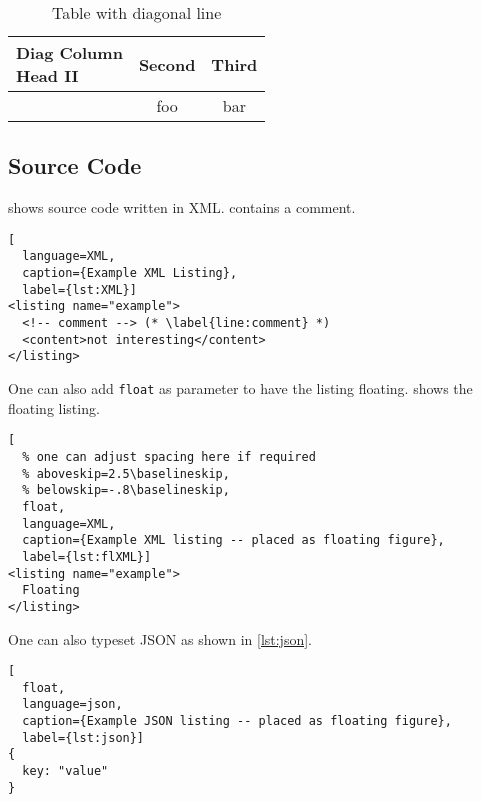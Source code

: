 \documentclass[sigconf,balance]{acmart}
\begin{document}
\begin{ltgexample}
\begin{table}
  \caption{Table with diagonal line}
  \label{tab:diag}
  \begin{center}
    \begin{tabular}{|l|c|c|}
      \hline
      \diagbox[width=10em]{Diag \\Column Head I}{Diag Column\\Head II} & Second & Third \\
      \hline
       & foo & bar              \\
      \hline
    \end{tabular}
  \end{center}
\end{table}
\end{ltgexample}


\subsection{Source Code}

\begin{ltgexample}
 shows source code written in XML.
 contains a comment.

\begin{lstlisting}[
  language=XML,
  caption={Example XML Listing},
  label={lst:XML}]
<listing name="example">
  <!-- comment --> (* \label{line:comment} *)
  <content>not interesting</content>
</listing>
\end{lstlisting}
\end{ltgexample}

One can also add \verb+float+ as parameter to have the listing floating.
 shows the floating listing.

\begin{ltgexample}
\begin{lstlisting}[
  % one can adjust spacing here if required
  % aboveskip=2.5\baselineskip,
  % belowskip=-.8\baselineskip,
  float,
  language=XML,
  caption={Example XML listing -- placed as floating figure},
  label={lst:flXML}]
<listing name="example">
  Floating
</listing>
\end{lstlisting}
\end{ltgexample}

One can also typeset JSON as shown in \cref{lst:json}.

\begin{ltgexample}
\begin{lstlisting}[
  float,
  language=json,
  caption={Example JSON listing -- placed as floating figure},
  label={lst:json}]
{
  key: "value"
}
\end{lstlisting}
\end{ltgexample}
\end{document}
